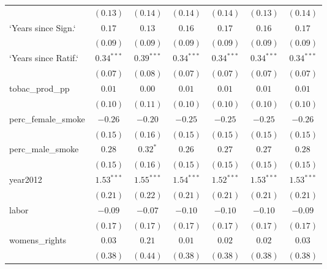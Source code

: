 \begin{table}[!h]
\begin{center}
\begin{tabular}{l c c c c c c }
                        & $(0.13)$     & $(0.14)$     & $(0.14)$     & $(0.14)$     & $(0.13)$     & $(0.14)$     \\
`Years since Sign.`     & $0.17$       & $0.13$       & $0.16$       & $0.17$       & $0.16$       & $0.17$       \\
                        & $(0.09)$     & $(0.09)$     & $(0.09)$     & $(0.09)$     & $(0.09)$     & $(0.09)$     \\
`Years since Ratif.`    & $0.34^{***}$ & $0.39^{***}$ & $0.34^{***}$ & $0.34^{***}$ & $0.34^{***}$ & $0.34^{***}$ \\
                        & $(0.07)$     & $(0.08)$     & $(0.07)$     & $(0.07)$     & $(0.07)$     & $(0.07)$     \\
tobac\_prod\_pp         & $0.01$       & $0.00$       & $0.01$       & $0.01$       & $0.01$       & $0.01$       \\
                        & $(0.10)$     & $(0.11)$     & $(0.10)$     & $(0.10)$     & $(0.10)$     & $(0.10)$     \\
perc\_female\_smoke     & $-0.26$      & $-0.20$      & $-0.25$      & $-0.25$      & $-0.25$      & $-0.26$      \\
                        & $(0.15)$     & $(0.16)$     & $(0.15)$     & $(0.15)$     & $(0.15)$     & $(0.15)$     \\
perc\_male\_smoke       & $0.28$       & $0.32^{*}$   & $0.26$       & $0.27$       & $0.27$       & $0.28$       \\
                        & $(0.15)$     & $(0.16)$     & $(0.15)$     & $(0.15)$     & $(0.15)$     & $(0.15)$     \\
year2012                & $1.53^{***}$ & $1.55^{***}$ & $1.54^{***}$ & $1.52^{***}$ & $1.53^{***}$ & $1.53^{***}$ \\
                        & $(0.21)$     & $(0.22)$     & $(0.21)$     & $(0.21)$     & $(0.21)$     & $(0.21)$     \\
labor                   & $-0.09$      & $-0.07$      & $-0.10$      & $-0.10$      & $-0.10$      & $-0.09$      \\
                        & $(0.17)$     & $(0.17)$     & $(0.17)$     & $(0.17)$     & $(0.17)$     & $(0.17)$     \\
womens\_rights          & $0.03$       & $0.21$       & $0.01$       & $0.02$       & $0.02$       & $0.03$       \\
                        & $(0.38)$     & $(0.44)$     & $(0.38)$     & $(0.38)$     & $(0.38)$     & $(0.38)$     \\

\end{tabular}
\end{center}
\end{table}
